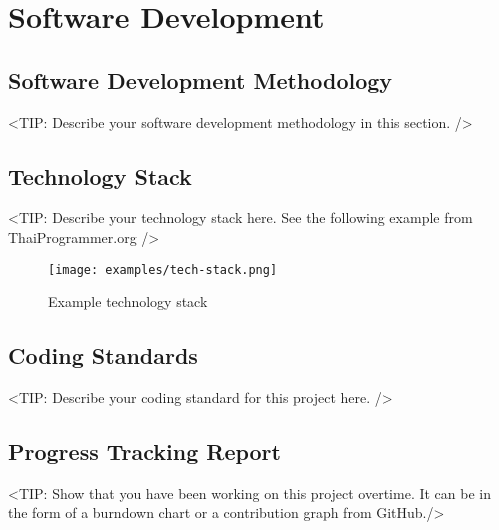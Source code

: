 \chapter{Software Development}
\label{chap:software-development}

\section{Software Development Methodology}
\label{section:software-development-methodology}
<TIP: Describe your software development methodology in this section. />

\section{Technology Stack}
\label{section:technology-stack}
<TIP: Describe your technology stack here. See the following example from ThaiProgrammer.org />
\begin{figure}[h]
    \centering
    \texttt{[image: examples/tech-stack.png]}
    \caption{Example technology stack}
\end{figure}

\section{Coding Standards}
\label{section:coding-standards}
<TIP: Describe your coding standard for this project here. />

\section{Progress Tracking Report}
\label{section:progress-tracking-report}
<TIP: Show that you have been working on this project overtime.
It can be in the form of a burndown chart or a contribution graph from GitHub./>